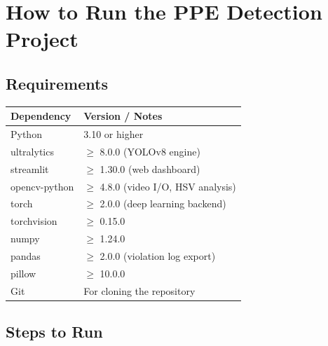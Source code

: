 \documentclass[12pt,a4paper]{report}
\begin{document}
\chapter{How to Run the PPE Detection Project}

\section{Requirements}

\begin{center}
\renewcommand{\arraystretch}{1.3}
\begin{tabular}{|p{4.5cm}|p{7cm}|}
\hline
\textbf{Dependency} & \textbf{Version / Notes} \\
\hline
Python            & 3.10 or higher \\
\hline
ultralytics       & $\geq$ 8.0.0 (YOLOv8 engine) \\
\hline
streamlit         & $\geq$ 1.30.0 (web dashboard) \\
\hline
opencv-python     & $\geq$ 4.8.0 (video I/O, HSV analysis) \\
\hline
torch             & $\geq$ 2.0.0 (deep learning backend) \\
\hline
torchvision       & $\geq$ 0.15.0 \\
\hline
numpy             & $\geq$ 1.24.0 \\
\hline
pandas            & $\geq$ 2.0.0 (violation log export) \\
\hline
pillow            & $\geq$ 10.0.0 \\
\hline
Git               & For cloning the repository \\
\hline
\end{tabular}
\end{center}

\section{Steps to Run}
\end{document}
